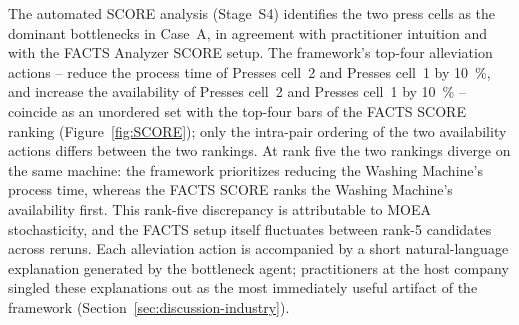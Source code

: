 \documentclass[a4paper,fleqn]{cas-sc}
\begin{document}
  The automated SCORE analysis (Stage~S4) identifies the two press cells as                                                                 
  the dominant bottlenecks in Case~A, in agreement with practitioner
  intuition and with the FACTS Analyzer SCORE setup. The framework's top-four                                                               
  alleviation actions -- reduce the process time of Presses cell~2 and                                                                      
  Presses cell~1 by 10~\%, and increase the availability of Presses cell~2                                                                  
  and Presses cell~1 by 10~\% -- coincide as an unordered set with the                                                                      
  top-four bars of the FACTS SCORE ranking (Figure~\ref{fig:SCORE}); only the                                                               
  intra-pair ordering of the two availability actions differs between the                                                                   
  two rankings. At rank five the two rankings diverge on the same machine:                                                                  
  the framework prioritizes reducing the Washing Machine's process time,                                                                    
  whereas the FACTS SCORE ranks the Washing Machine's availability first.                                                                   
  This rank-five discrepancy is attributable to MOEA stochasticity, and the                                                                 
  FACTS setup itself fluctuates between rank-5 candidates across reruns.                                                                    
  Each alleviation action is accompanied by a short natural-language                                                                        
  explanation generated by the bottleneck agent; practitioners at the host                                                                  
  company singled these explanations out as the most immediately useful                                                                     
  artifact of the framework                                                                                                                 
  (Section~\ref{sec:discussion-industry}).                                                                                                  
                                                                                                                                            
\end{document}
